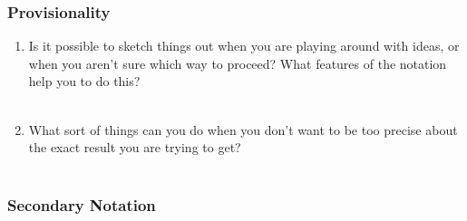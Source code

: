 \documentclass[14pt]{article}
\newcommand{\answerbox}{
\fbox{
\begin{minipage}{16cm}
\hfill\vspace{2cm}
\end{minipage}
}\\
}
\begin{document}
\subsubsection{Provisionality}

\begin{enumerate}
\item Is it possible to sketch things out when you are playing around with ideas, or when you aren’t sure which way to proceed? What features of the notation help you to do this?\\
\answerbox
\item What sort of things can you do when you don’t want to be too precise about the exact result you are trying to get?\\
\answerbox
\end{enumerate}

%

%

\subsubsection{Secondary Notation}
\end{document}
